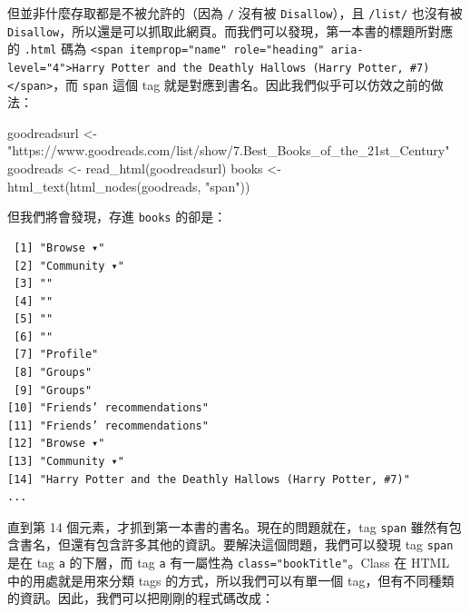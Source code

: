 \documentclass[
]{book}
\newenvironment{Shaded}{\begin{snugshade}}{\end{snugshade}}
\newcommand{\FunctionTok}[1]{\textcolor[rgb]{0.00,0.00,0.00}{#1}}
\newcommand{\NormalTok}[1]{#1}
\newcommand{\OtherTok}[1]{\textcolor[rgb]{0.56,0.35,0.01}{#1}}
\newcommand{\StringTok}[1]{\textcolor[rgb]{0.31,0.60,0.02}{#1}}
\theoremstyle{definition}
\theoremstyle{remark}
\begin{document}
但並非什麼存取都是不被允許的（因為 \texttt{/} 沒有被 \texttt{Disallow}），且 \texttt{/list/} 也沒有被 \texttt{Disallow}，所以還是可以抓取此網頁。而我們可以發現，第一本書的標題所對應的 \texttt{.html} 碼為 \texttt{\textless{}span\ itemprop="name"\ role="heading"\ aria-level="4"\textgreater{}Harry\ Potter\ and\ the\ Deathly\ Hallows\ (Harry\ Potter,\ \#7)\textless{}/span\textgreater{}}，而 \texttt{span} 這個 tag 就是對應到書名。因此我們似乎可以仿效之前的做法：

\begin{Shaded}
\begin{Highlighting}[]
\NormalTok{goodreadsurl }\OtherTok{\textless{}{-}} \StringTok{"https://www.goodreads.com/list/show/7.Best\_Books\_of\_the\_21st\_Century"}
\NormalTok{goodreads }\OtherTok{\textless{}{-}} \FunctionTok{read\_html}\NormalTok{(goodreadsurl)}
\NormalTok{books }\OtherTok{\textless{}{-}} \FunctionTok{html\_text}\NormalTok{(}\FunctionTok{html\_nodes}\NormalTok{(goodreads, }\StringTok{"span"}\NormalTok{))}
\end{Highlighting}
\end{Shaded}

但我們將會發現，存進 \texttt{books} 的卻是：

\begin{verbatim}
 [1] "Browse ▾"                                                          
 [2] "Community ▾"                                                       
 [3] ""                                                                  
 [4] ""                                                                  
 [5] ""                                                                  
 [6] ""                                                                  
 [7] "Profile"                                                           
 [8] "Groups"                                                            
 [9] "Groups"                                                            
[10] "Friends’ recommendations"                                          
[11] "Friends’ recommendations"                                          
[12] "Browse ▾"                                                          
[13] "Community ▾"                                                       
[14] "Harry Potter and the Deathly Hallows (Harry Potter, #7)"      
...
\end{verbatim}

直到第 14 個元素，才抓到第一本書的書名。現在的問題就在，tag \texttt{span} 雖然有包含書名，但還有包含許多其他的資訊。要解決這個問題，我們可以發現 tag \texttt{span} 是在 tag \texttt{a} 的下層，而 tag \texttt{a} 有一屬性為 \texttt{class="bookTitle"}。Class 在 HTML 中的用處就是用來分類 tags 的方式，所以我們可以有單一個 tag，但有不同種類的資訊。因此，我們可以把剛剛的程式碼改成：
\end{document}
